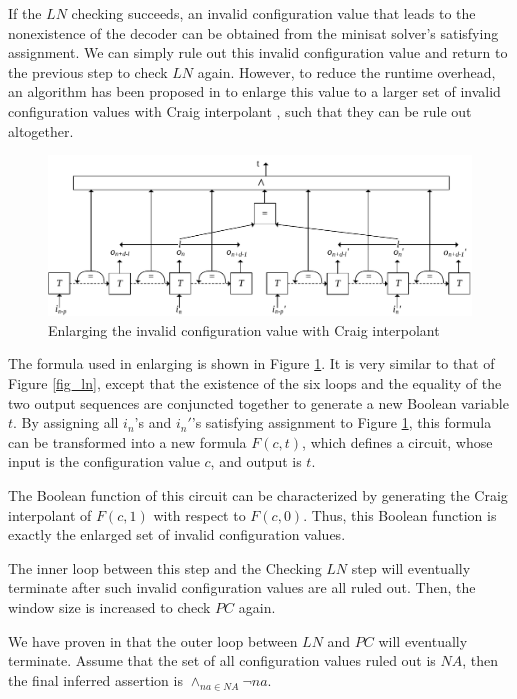 \documentclass[runningheads,a4paper]{llncs}
\begin{document}
If the $LN$ checking succeeds,
an invalid configuration value that leads to the nonexistence of the decoder can be obtained from the  minisat \cite{EXTSAT} solver's satisfying assignment.
We can simply rule out this invalid configuration value and return to the previous step to check $LN$ again.
However,
to reduce the runtime overhead,
an algorithm has been proposed in \cite{ShengYuShen:iccad11} to enlarge this value to a larger set of invalid configuration values with Craig interpolant \cite{Craig},
such that they can be rule out altogether.
\begin{figure}[t]
\centering
\includegraphics[width=\textwidth]{lninfer}
\caption{Enlarging the invalid configuration value with Craig interpolant}
\label{fig_lninfer}
\end{figure}

The formula used in enlarging is shown in Figure \ref{fig_lninfer}.
It is very similar to that of Figure \ref{fig_ln},
except that the existence of the six loops and the equality of the two output sequences are conjuncted together to generate a new Boolean variable $t$.
By assigning all $i_n$'s and $i_n'$'s satisfying assignment to Figure \ref{fig_lninfer},
this formula can be transformed into a new formula $F(c,t)$,
which defines a circuit,
whose input is the configuration value $c$,
and output is $t$.

The Boolean function of this circuit can be characterized by generating the Craig interpolant of $F(c,1)$ with respect to $F(c,0)$.
Thus,
this Boolean function is exactly the enlarged set of invalid configuration values.


The inner loop between this step and the Checking $LN$ step will eventually terminate after such invalid configuration values are all ruled out.
Then,
the window size is increased to check $PC$ again.



We have proven in \cite{ShengYuShen:iccad11} that the outer loop between $LN$ and $PC$ will eventually terminate.
Assume that the set of all configuration values ruled out is $NA$,
then the final inferred assertion is $\wedge_{na\in NA}\neg na$.
\end{document}
